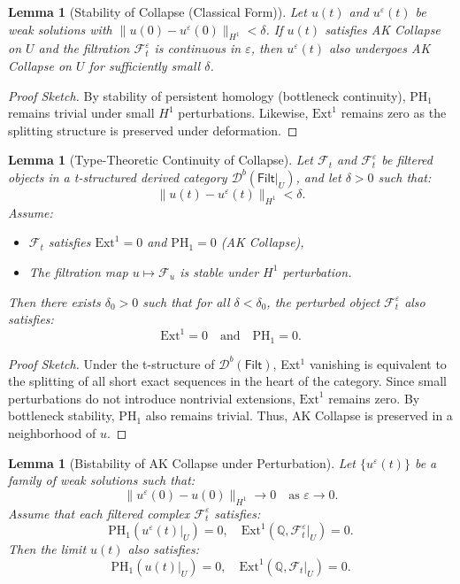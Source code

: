 \documentclass[11pt]{article}
\newtheorem{lemma}[theorem]{Lemma}
\theoremstyle{definition}
\begin{document}
\begin{lemma}[Stability of Collapse (Classical Form)]
Let $u(t)$ and $u^\varepsilon(t)$ be weak solutions with $\|u(0)-u^\varepsilon(0)\|_{H^1} < \delta$.  
If $u(t)$ satisfies AK Collapse on $U$ and the filtration $\mathcal{F}^\varepsilon_t$ is continuous in $\varepsilon$,  
then $u^\varepsilon(t)$ also undergoes AK Collapse on $U$ for sufficiently small $\delta$.
\end{lemma}

\begin{proof}[Proof Sketch]
By stability of persistent homology (bottleneck continuity), PH$_1$ remains trivial under small $H^1$ perturbations.  
Likewise, $\mathrm{Ext}^1$ remains zero as the splitting structure is preserved under deformation.
\end{proof}

\begin{lemma}[Type-Theoretic Continuity of Collapse]
Let $\mathcal{F}_t$ and $\mathcal{F}^\varepsilon_t$ be filtered objects in a t-structured derived category $\mathcal{D}^b(\mathsf{Filt}|_U)$,  
and let $\delta > 0$ such that:
\[
\|u(t) - u^\varepsilon(t)\|_{H^1} < \delta.
\]
Assume:
\begin{itemize}
  \item $\mathcal{F}_t$ satisfies $\mathrm{Ext}^1 = 0$ and $\mathrm{PH}_1 = 0$ (AK Collapse),
  \item The filtration map \( u \mapsto \mathcal{F}_u \) is stable under $H^1$ perturbation.
\end{itemize}
Then there exists $\delta_0 > 0$ such that for all $\delta < \delta_0$,  
the perturbed object $\mathcal{F}^\varepsilon_t$ also satisfies:
\[
\mathrm{Ext}^1 = 0 \quad \text{and} \quad \mathrm{PH}_1 = 0.
\]
\end{lemma}

\begin{proof}[Proof Sketch]
Under the t-structure of $\mathcal{D}^b(\mathsf{Filt})$, Ext$^1$ vanishing is equivalent to the splitting of all short exact sequences  
in the heart of the category. Since small perturbations do not introduce nontrivial extensions, $\mathrm{Ext}^1$ remains zero.  
By bottleneck stability, $\mathrm{PH}_1$ also remains trivial.  
Thus, AK Collapse is preserved in a neighborhood of $u$.
\end{proof}

\begin{lemma}[Bistability of AK Collapse under Perturbation]
Let $\{ u^\varepsilon(t) \}$ be a family of weak solutions such that:
\[
\| u^\varepsilon(0) - u(0) \|_{H^1} \to 0 \quad \text{as } \varepsilon \to 0.
\]
Assume that each filtered complex $\mathcal{F}^\varepsilon_t$ satisfies:
\[
\mathrm{PH}_1(u^\varepsilon(t)|_U) = 0, \quad \mathrm{Ext}^1(\mathbb{Q}, \mathcal{F}^\varepsilon_t|_U) = 0.
\]
Then the limit $u(t)$ also satisfies:
\[
\mathrm{PH}_1(u(t)|_U) = 0, \quad \mathrm{Ext}^1(\mathbb{Q}, \mathcal{F}_t|_U) = 0.
\]
\end{lemma}
\end{document}

